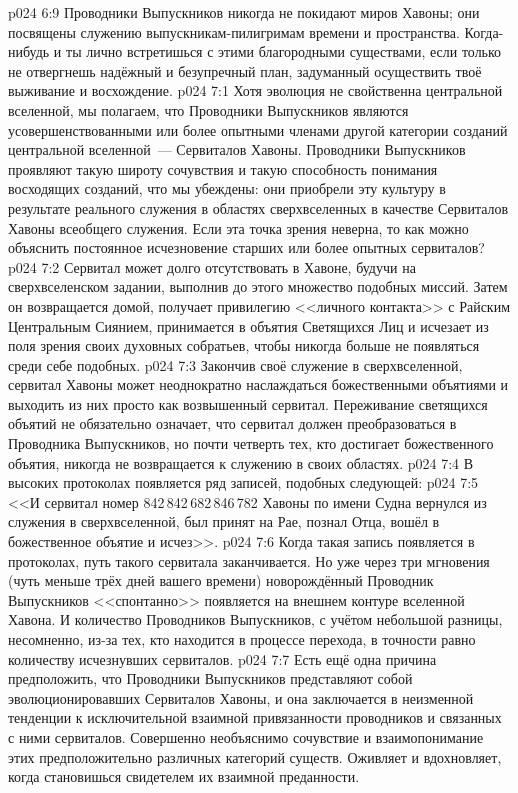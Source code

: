 \vs p024 6:9 \pc Проводники Выпускников никогда не покидают миров Хавоны; они посвящены служению выпускникам\hyp{}пилигримам времени и пространства. Когда\hyp{}нибудь и ты лично встретишься с этими благородными существами, если только не отвергнешь надёжный и безупречный план, задуманный осуществить твоё выживание и восхождение.
\vs p024 7:1 Хотя эволюция не свойственна центральной вселенной, мы полагаем, что Проводники Выпускников являются усовершенствованными или более опытными членами другой категории созданий центральной вселенной~--- Сервиталов Хавоны. Проводники Выпускников проявляют такую широту сочувствия и такую способность понимания восходящих созданий, что мы убеждены: они приобрели эту культуру в результате реального служения в областях сверхвселенных в качестве Сервиталов Хавоны всеобщего служения. Если эта точка зрения неверна, то как можно объяснить постоянное исчезновение старших или более опытных сервиталов?
\vs p024 7:2 Сервитал может долго отсутствовать в Хавоне, будучи на сверхвселенском задании, выполнив до этого множество подобных миссий. Затем он возвращается домой, получает привилегию <<личного контакта>> с Райским Центральным Сиянием, принимается в объятия Светящихся Лиц и исчезает из поля зрения своих духовных собратьев, чтобы никогда больше не появляться среди себе подобных.
\vs p024 7:3 Закончив своё служение в сверхвселенной, сервитал Хавоны может неоднократно наслаждаться божественными объятиями и выходить из них просто как возвышенный сервитал. Переживание светящихся объятий не обязательно означает, что сервитал должен преобразоваться в Проводника Выпускников, но почти четверть тех, кто достигает божественного объятия, никогда не возвращается к служению в своих областях.
\vs p024 7:4 \pc В высоких протоколах появляется ряд записей, подобных следующей:
\vs p024 7:5 <<И сервитал номер 842\,842\,682\,846\,782 Хавоны по имени Судна вернулся из служения в сверхвселенной, был принят на Рае, познал Отца, вошёл в божественное объятие и исчез>>.
\vs p024 7:6 Когда такая запись появляется в протоколах, путь такого сервитала заканчивается. Но уже через три мгновения (чуть меньше трёх дней вашего времени) новорождённый Проводник Выпускников <<спонтанно>> появляется на внешнем контуре вселенной Хавона. И количество Проводников Выпускников, с учётом небольшой разницы, несомненно, из\hyp{}за тех, кто находится в процессе перехода, в точности равно количеству исчезнувших сервиталов.
\vs p024 7:7 \pc Есть ещё одна причина предположить, что Проводники Выпускников представляют собой эволюционировавших Сервиталов Хавоны, и она заключается в неизменной тенденции к исключительной взаимной привязанности проводников и связанных с ними сервиталов. Совершенно необъяснимо сочувствие и взаимопонимание этих предположительно различных категорий существ. Оживляет и вдохновляет, когда становишься свидетелем их взаимной преданности.
